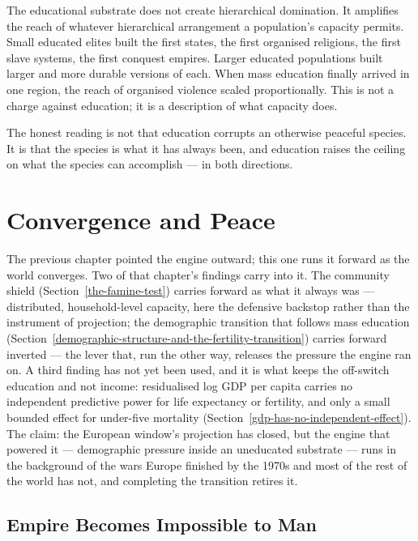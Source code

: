\documentclass[12pt,letterpaper]{article}
\begin{document}
The educational substrate does not create hierarchical domination. It
amplifies the reach of whatever hierarchical arrangement a
population's capacity permits. Small educated elites built the first
states, the first organised religions, the first slave systems, the
first conquest empires. Larger educated populations built larger and
more durable versions of each. When mass education finally arrived in
one region, the reach of organised violence scaled proportionally.
This is not a charge against education; it is a description of what
capacity does.

The honest reading is not that education corrupts an otherwise
peaceful species. It is that the species is what it has always been,
and education raises the ceiling on what the species can accomplish
--- in both directions.

\section{Convergence and Peace}\label{convergence-and-peace}

The previous chapter pointed the engine outward; this one runs it
forward as the world converges. Two of that chapter's findings carry
into it. The community shield (Section~\ref{the-famine-test}) carries
forward as what it always was --- distributed, household-level
capacity, here the defensive backstop rather than the instrument of
projection; the demographic transition that follows mass education
(Section~\ref{demographic-structure-and-the-fertility-transition})
carries forward inverted --- the lever that, run the other way,
releases the pressure the engine ran on. A third finding has not yet
been used, and it is what keeps the off-switch education and not
income: residualised log GDP per capita carries no independent
predictive power for life expectancy or fertility, and only a small
bounded effect for under-five mortality
(Section~\ref{gdp-has-no-independent-effect}). The claim: the
European window's projection has closed, but the engine that powered
it --- demographic pressure inside an uneducated substrate --- runs in
the background of the wars Europe finished by the 1970s and most of
the rest of the world has not, and completing the transition retires
it.

\subsection{Empire Becomes Impossible to Man}\label{empire-impossible-to-man}
\end{document}
